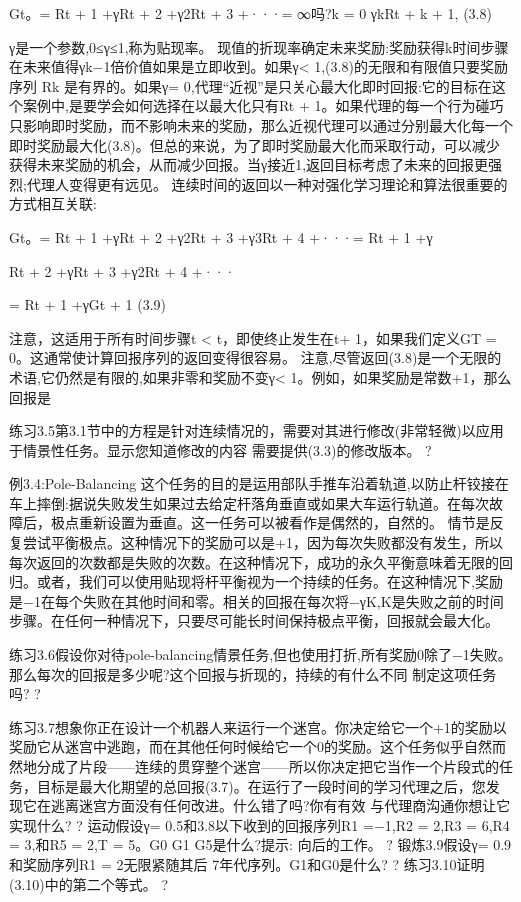 Gt。= Rt + 1 +γRt + 2 +γ2Rt + 3 +···=
∞吗?k = 0
γkRt + k + 1, 					(3.8)

γ是一个参数,0≤γ≤1,称为贴现率。
现值的折现率确定未来奖励:奖励获得k时间步骤在未来值得γk−1倍价值如果是立即收到。如果γ< 1,(3.8)的无限和有限值只要奖励序列{ Rk }是有界的。如果γ= 0,代理“近视”是只关心最大化即时回报:它的目标在这个案例中,是要学会如何选择在以最大化只有Rt + 1。如果代理的每一个行为碰巧只影响即时奖励，而不影响未来的奖励，那么近视代理可以通过分别最大化每一个即时奖励最大化(3.8)。但总的来说，为了即时奖励最大化而采取行动，可以减少获得未来奖励的机会，从而减少回报。当γ接近1,返回目标考虑了未来的回报更强烈;代理人变得更有远见。
连续时间的返回以一种对强化学习理论和算法很重要的方式相互关联:

Gt。= Rt + 1 +γRt + 2 +γ2Rt + 3 +γ3Rt + 4 +···= Rt + 1 +γ

Rt + 2 +γRt + 3 +γ2Rt + 4 +···

= Rt + 1 +γGt + 1 					(3.9)

注意，这适用于所有时间步骤t < t，即使终止发生在t+ 1，如果我们定义GT = 0。这通常使计算回报序列的返回变得很容易。
注意,尽管返回(3.8)是一个无限的术语,它仍然是有限的,如果非零和奖励不变γ< 1。例如，如果奖励是常数+1，那么回报是


练习3.5第3.1节中的方程是针对连续情况的，需要对其进行修改(非常轻微)以应用于情景性任务。显示您知道修改的内容
需要提供(3.3)的修改版本。 					?

例3.4:Pole-Balancing
这个任务的目的是运用部队手推车沿着轨道,以防止杆铰接在车上摔倒:据说失败发生如果过去给定杆落角垂直或如果大车运行轨道。在每次故障后，极点重新设置为垂直。这一任务可以被看作是偶然的，自然的。
情节是反复尝试平衡极点。这种情况下的奖励可以是+1，因为每次失败都没有发生，所以每次返回的次数都是失败的次数。在这种情况下，成功的永久平衡意味着无限的回归。或者，我们可以使用贴现将杆平衡视为一个持续的任务。在这种情况下,奖励是−1在每个失败在其他时间和零。相关的回报在每次将−γK,K是失败之前的时间步骤。在任何一种情况下，只要尽可能长时间保持极点平衡，回报就会最大化。


练习3.6假设你对待pole-balancing情景任务,但也使用打折,所有奖励0除了−1失败。那么每次的回报是多少呢?这个回报与折现的，持续的有什么不同
制定这项任务吗? 					?

练习3.7想象你正在设计一个机器人来运行一个迷宫。你决定给它一个+1的奖励以奖励它从迷宫中逃跑，而在其他任何时候给它一个0的奖励。这个任务似乎自然而然地分成了片段——连续的贯穿整个迷宫——所以你决定把它当作一个片段式的任务，目标是最大化期望的总回报(3.7)。在运行了一段时间的学习代理之后，您发现它在逃离迷宫方面没有任何改进。什么错了吗?你有有效
与代理商沟通你想让它实现什么? 					?
运动假设γ= 0.5和3.8以下收到的回报序列R1 =−1,R2 = 2,R3 = 6,R4 = 3,和R5 = 2,T = 5。G0 G1 G5是什么?提示:
向后的工作。 					?
锻炼3.9假设γ= 0.9和奖励序列R1 = 2无限紧随其后
7年代序列。G1和G0是什么? 					?
练习3.10证明(3.10)中的第二个等式。 					?

